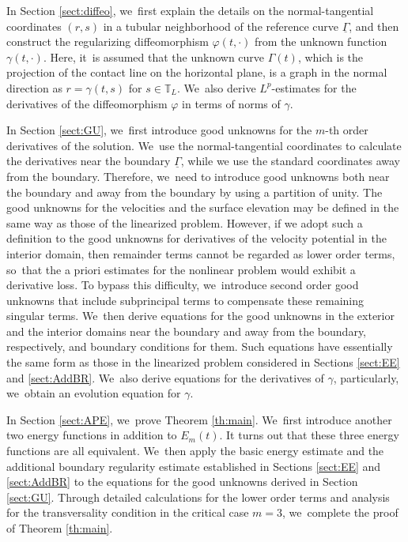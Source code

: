 \documentclass[10pt]{amsart}
\newcommand{\ul}[1]{\underline{#1}}
\newcommand{\itGamma}{\mathit{\Gamma}}
\theoremstyle{definition}
\begin{document}
In Section \ref{sect:diffeo}, we~first explain the details on the normal-tangential coordinates $(r,s)$ in a tubular neighborhood
of the reference curve $\ul{\itGamma}$, and then construct the regularizing diffeomorphism $\varphi(t,\cdot)$ from the unknown function $\gamma(t,\cdot)$.
Here, it~is assumed that the unknown curve $\itGamma(t)$, which is the projection of the contact line on the horizontal plane,
is a graph in the normal direction as $r=\gamma(t,s)$ for $s\in\mathbb{T}_L$. We~also derive $L^p$-estimates for the derivatives of the diffeomorphism $\varphi$ in terms of norms of $\gamma$.

In Section \ref{sect:GU}, we~first introduce good unknowns for the $m$-th order derivatives of the solution. We~use the normal-tangential coordinates to calculate the derivatives near the boundary $\ul{\itGamma}$,
while we use the standard coordinates away from the boundary.
Therefore, we~need to introduce good unknowns both near the boundary and away from the boundary by using a partition of unity.
The good unknowns for the velocities and the surface elevation may be defined in the same way as those of the linearized problem.
However, if we adopt such a definition to the good unknowns for derivatives of the velocity potential in the interior domain,
then remainder terms cannot be regarded as lower order terms, so~that the a priori estimates for the nonlinear problem would exhibit a derivative loss.
To bypass this difficulty, we~introduce second order good unknowns that include subprincipal terms to compensate these remaining singular terms. We~then derive equations for the good unknowns in the exterior and the interior domains near the boundary and away from the boundary, respectively,
and boundary conditions for them.
Such equations have essentially the same form as those in the linearized problem considered in Sections \ref{sect:EE} and \ref{sect:AddBR}. We~also derive equations for the derivatives of $\gamma$, particularly, we~obtain an evolution equation for $\gamma$.

In Section \ref{sect:APE}, we~prove Theorem \ref{th:main}. We~first introduce another two energy functions in addition to $E_m(t)$.
It turns out that these three energy functions are all equivalent. We~then apply the basic energy estimate and the additional boundary regularity estimate established in Sections \ref{sect:EE} and \ref{sect:AddBR}
to the equations for the good unknowns derived in Section \ref{sect:GU}.
Through detailed calculations for the lower order terms and analysis for the transversality condition in the critical case $m=3$, we~complete the proof of Theorem \ref{th:main}.
\end{document}
